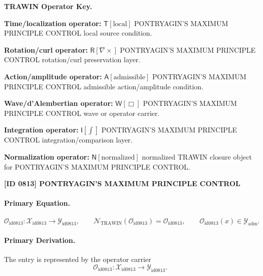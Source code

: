 \par\vspace{0.45\baselineskip}
\noindent\begin{minipage}[t]{\linewidth}
\begingroup
\small
\raggedright
\textbf{TRAWIN Operator Key.}\par
\noindent\textbf{Time/localization operator:} $\mathsf{T}\!\left[\mathrm{local}\right]$ PONTRYAGIN'S MAXIMUM PRINCIPLE CONTROL local source condition.\par
\noindent\textbf{Rotation/curl operator:} $\mathsf{R}\!\left[\nabla\times\right]$ PONTRYAGIN'S MAXIMUM PRINCIPLE CONTROL rotation/curl preservation layer.\par
\noindent\textbf{Action/amplitude operator:} $\mathsf{A}\!\left[\mathrm{admissible}\right]$ PONTRYAGIN'S MAXIMUM PRINCIPLE CONTROL admissible action/amplitude condition.\par
\noindent\textbf{Wave/d'Alembertian operator:} $\mathsf{W}\!\left[\Box\right]$ PONTRYAGIN'S MAXIMUM PRINCIPLE CONTROL wave or operator carrier.\par
\noindent\textbf{Integration operator:} $\mathsf{I}\!\left[\int\right]$ PONTRYAGIN'S MAXIMUM PRINCIPLE CONTROL integration/comparison layer.\par
\noindent\textbf{Normalization operator:} $\mathsf{N}\!\left[\mathrm{normalized}\right]$ normalized TRAWIN closure object for PONTRYAGIN'S MAXIMUM PRINCIPLE CONTROL.\par
\endgroup
\end{minipage}

\clearpage
\noindent\textbf{[ID 0813] PONTRYAGIN'S MAXIMUM PRINCIPLE CONTROL}\par
\vspace{0.35em}
\paragraph{Primary Equation.}
\[
\mathcal{O}_{\mathrm{id0813}}:\mathcal{X}_{\mathrm{id0813}}\longrightarrow \mathcal{Y}_{\mathrm{id0813}},\qquad
\mathcal{N}_{\mathrm{TRAWIN}}(\mathcal{O}_{\mathrm{id0813}})=\mathcal{O}_{\mathrm{id0813}},\qquad
\mathcal{O}_{\mathrm{id0813}}(x)\in\mathcal{Y}_{\mathrm{adm}}.
\]

\paragraph{Primary Derivation.} The entry is represented by the operator carrier\[
\mathcal{O}_{\mathrm{id0813}}:\mathcal{X}_{\mathrm{id0813}}\longrightarrow \mathcal{Y}_{\mathrm{id0813}}.
\]

